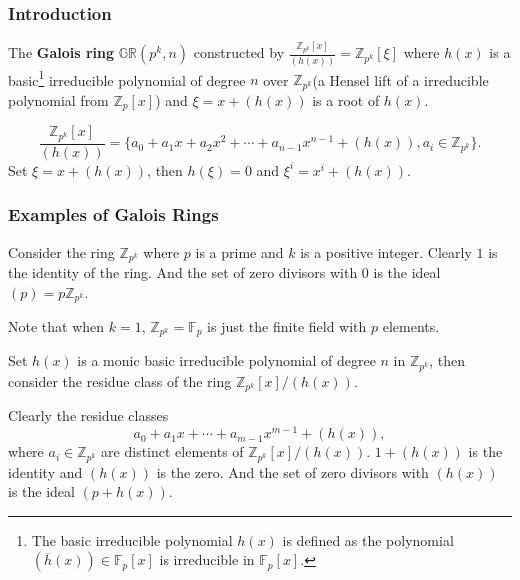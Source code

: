 \documentclass[
    aspectratio=169,                   %
]{beamer}
\renewcommand{\Bbb}{\mathbb}
\newcommand{\Z}{\mathbb{Z}}
\newcommand{\GR}{\mathbb{GR}}
\newcommand{\F}{\mathbb{F}}
\begin{document}
    \begin{frame}
        \frametitle{Introduction}
        \begin{definition}
            The \textbf{Galois ring} $\GR(p^k,n)$ constructed by $\frac{\Bbb Z_{p^k}[x]}{ (h(x))}= \Bbb Z_{p^k}[\xi]$ 
            where $h(x)$ is a basic\footnote{The basic irreducible polynomial $h(x)$ is defined as the 
            polynomial $(\overline{h}(x))\in\Bbb F_p[x]$ is irreducible in $\Bbb F_p[x]$.} irreducible polynomial of degree $n$ over $\Bbb Z_{p^k}$(a Hensel lift of a irreducible polynomial from $\Bbb Z_p[x]$) and $\xi=x+(h(x))$ is a root of $h(x)$. 
        \end{definition}
        \[\frac{\Bbb Z_{p^k}[x]}{ (h(x)) }=\{a_0+a_1x+a_2x^2+\cdots+a_{n-1}x^{n-1}+ (h(x)), a_i\in\Z_{p^k} \}.\]
        Set $ \xi=x+ (h(x))  $, then $ h(\xi)=0 $ and $ \xi^i=x^i+(h(x))$. 
    \end{frame}
    \begin{frame}
        \frametitle{Examples of Galois Rings}
    
        \begin{example}
            Consider the ring $ \Z_{p^k} $ where $ p $ is a prime and $ k $ is a positive integer. 
            Clearly $ 1 $ is the identity of the ring. 
            And the set of zero divisors with $ 0 $ is the ideal $ (p)=p\Z_{p^k} $. 
            
            Note that when $ k=1 $, $ \Z_{p^k}=\F_p $ is just the finite field with $ p $ elements.
        \end{example}
        \begin{example}
            Set $ h(x) $ is a monic basic irreducible polynomial of degree $ n $ in $ \Z_{p^k} $, 
            then consider the residue class of the ring $ \Z_{p^k}[x]/(h(x)) $.
            
            Clearly the residue classes 
            \[a_0+a_1x+\cdots+a_{m-1}x^{m-1}+(h(x)),\]
            where $ a_i\in\Z_{p^k} $ are distinct elements of $ \Z_{p^k}[x]/(h(x)) $.
            $ 1+(h(x)) $ is the identity and $ (h(x)) $ is the zero.
            And the set of zero divisors with $ (h(x)) $ is the ideal $ (p+h(x)) $.
        \end{example}
    \end{frame}
\end{document}
